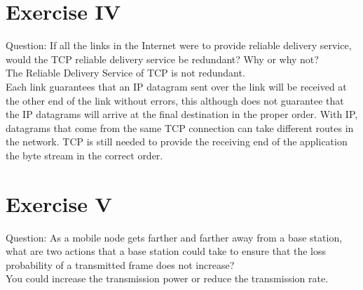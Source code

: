 \documentclass[11pt]{article}
\begin{document}
	\section*{Exercise IV}
	Question: If all the links in the Internet were to provide reliable delivery service, would the TCP reliable delivery service be redundant? Why or why not?\\
	\linebreak
	The Reliable Delivery Service of TCP is not redundant. \\
	Each link guarantees that an IP datagram sent over the link will be received at the other end of the link without errors, this although does not guarantee that the IP datagrams will arrive at the final destination in the proper order. With IP, datagrams that come from the same TCP connection can take different routes in the network. TCP is still needed to provide the receiving end of the application the byte stream in the correct order.

	\section*{Exercise V}
	Question:
	As a mobile node gets farther and farther away from a base station, what are two actions that a base station could take to ensure that the loss probability of a transmitted frame does not increase?\\
  \linebreak
  You could increase the transmission power or reduce the transmission rate.
\end{document}
